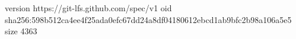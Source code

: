 version https://git-lfs.github.com/spec/v1
oid sha256:598b512ca4ee4f25ada0efc67dd24a8df04180612ebcd1ab9bfc2b98a106a5e5
size 4363
